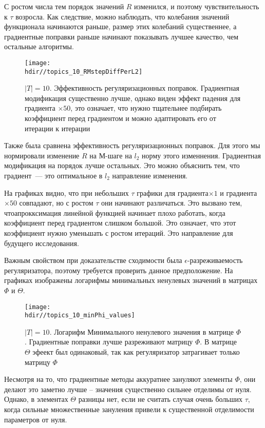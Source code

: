 \documentclass[12pt, twoside]{article}
\newcommand{\hdir}{.}
\begin{document}
С ростом числа тем порядок значений $R$ изменился, и поэтому чувствительность к $\tau$ возросла. Как следствие, можно наблюдать, что колебания значений функционала начинаются раньше, размер этих колебаний существеннее, а градиентные поправки раньше начинают показывать лучшее качество, чем остальные алгоритмы.

\begin{figure}[!ht]
	\centering 
	\texttt{[image: \\hdir//topics\_10\_RMstepDiffPerL2]}
	\caption{$|T| = 10$.  Эффективность регуляризационных поправок. Градиентная модификация существенно лучше, однако виден эффект падения для градиента $\times50$, это означает, что нужно тщательнее подбирать коэффициент перед градиентом и можно адаптировать его от итерации к итерации}   
\end{figure}

Также была сравнена эффективность регуляризационных поправок. Для этого мы нормировали изменение $R$ на М-шаге на $l_2$ норму этого изменнения. Градиентная модификация на порядок лучше остальных. Это можно объяснить тем, что градиент~--- это оптимальное в $l_2$ направление изменения.

На графиках видно, что при небольших $\tau$ графики для градиента${\times}1$ и градиента${\times}50$ совпадают, но с ростом $\tau$ они начинают различаться. Это вызвано тем, чтоапрокксимация линейной функцией начинает плохо работать, когда коэффициент перед градиентом слишком большой. Это означает, что этот коэффициент нужно уменьшать с ростом итераций. Это направление для будущего исследования.

Важным свойством при доказательстве сходимости была $\epsilon$-разреживаемость регуляризатора, поэтому требуется проверить данное предположение. На графиках изображены логарифмы минимальных ненулевых значений в матрицах $\Phi$ и $\Theta$.
\begin{figure}[!ht]
	\centering
	\texttt{[image: \\hdir//topics\_10\_minPhi\_values]}
	\caption{$|T| = 10$. Логарифм Минимального ненулевого значения в матрице $\Phi$. Градиентные поправки лучше разреживают матрицу $\Phi$. В матрице $\Theta$ эфеект был одинаковый, так как регуляризатор затрагивает только матрицу $\Phi$}    
\end{figure}
Несмотря на то, что градиентные методы аккуратнее  зануляют элементы $\Phi$, они делают это заметно лучше -- значения существенно сильнее отделимы от нуля. Однако, в элементах $\Theta$ разницы нет, если не считать случая очень больших $\tau$, когда сильные множественные зануления привели к существенной отделимости параметров от нуля.
\end{document}
